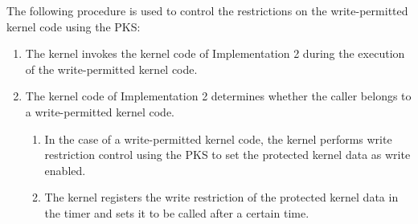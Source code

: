

The following procedure is used to control the restrictions on the write-permitted
kernel code using the PKS:

\begin{enumerate}[topsep=0pt]%
\item The kernel invokes the kernel code of Implementation 2 during the execution of the write-permitted kernel code.
  
\item The kernel code of Implementation 2 determines whether the caller belongs to a write-permitted kernel code.

\begin{enumerate}[topsep=0pt]%
\item In the case of a write-permitted kernel code, the kernel performs write restriction control using the PKS to set the protected kernel data as write enabled.
\item The kernel registers the write restriction of the protected kernel data in the timer and sets it to be called after a certain time.
      

\end{enumerate}
\end{enumerate}
